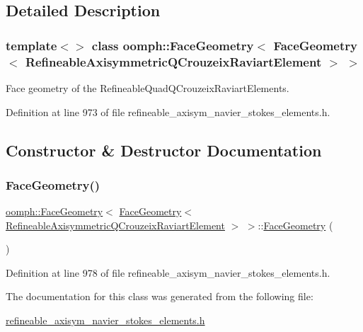 \subsection{Detailed Description}
\subsubsection*{template$<$$>$\newline
class oomph\+::\+Face\+Geometry$<$ Face\+Geometry$<$ Refineable\+Axisymmetric\+Q\+Crouzeix\+Raviart\+Element $>$ $>$}

Face geometry of the Refineable\+Quad\+Q\+Crouzeix\+Raviart\+Elements. 

Definition at line 973 of file refineable\+\_\+axisym\+\_\+navier\+\_\+stokes\+\_\+elements.\+h.



\subsection{Constructor \& Destructor Documentation}
\mbox{\label{classoomph_1_1FaceGeometry_3_01FaceGeometry_3_01RefineableAxisymmetricQCrouzeixRaviartElement_01_4_01_4_a28aa349f61b57f2ca237473b8f60deb9}} 
\subsubsection{\texorpdfstring{Face\+Geometry()}{FaceGeometry()}}
{\footnotesize\ttfamily \hyperlink{classoomph_1_1FaceGeometry}{oomph\+::\+Face\+Geometry}$<$ \hyperlink{classoomph_1_1FaceGeometry}{Face\+Geometry}$<$ \hyperlink{classoomph_1_1RefineableAxisymmetricQCrouzeixRaviartElement}{Refineable\+Axisymmetric\+Q\+Crouzeix\+Raviart\+Element} $>$ $>$\+::\hyperlink{classoomph_1_1FaceGeometry}{Face\+Geometry} (\begin{DoxyParamCaption}{ }\end{DoxyParamCaption})\hspace{0.3cm}{\ttfamily [inline]}}



Definition at line 978 of file refineable\+\_\+axisym\+\_\+navier\+\_\+stokes\+\_\+elements.\+h.



The documentation for this class was generated from the following file\+:\begin{DoxyCompactItemize}
\item 
\hyperlink{refineable__axisym__navier__stokes__elements_8h}{refineable\+\_\+axisym\+\_\+navier\+\_\+stokes\+\_\+elements.\+h}\end{DoxyCompactItemize}
